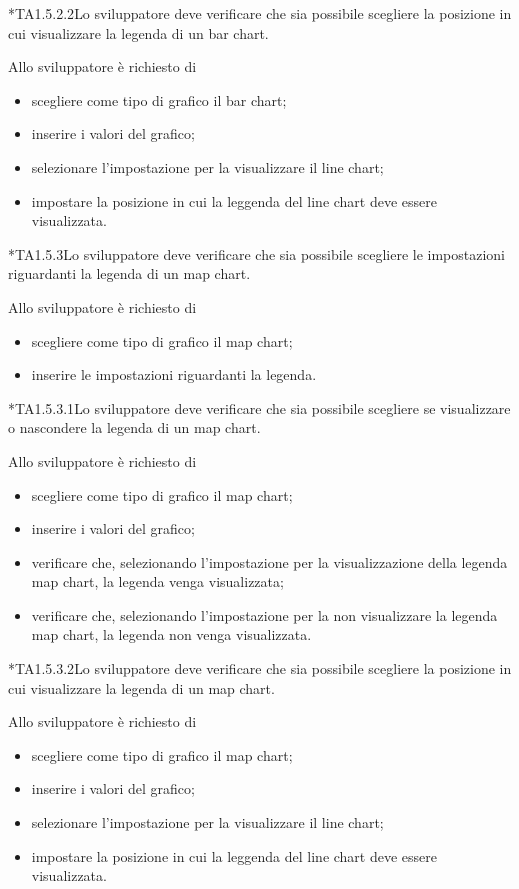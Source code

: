	*{TA1.5.2.2}Lo sviluppatore deve verificare che sia possibile scegliere la posizione in cui visualizzare la legenda di un bar chart.
			
		Allo sviluppatore è richiesto di
		\begin{itemize}
			\item scegliere come tipo di grafico il bar chart;
			\item inserire i valori del grafico;
			\item selezionare l'impostazione per la visualizzare il line chart;
			\item impostare la posizione in cui la leggenda del line chart deve essere visualizzata.
		\end{itemize}

	*{TA1.5.3}Lo sviluppatore deve verificare che sia possibile scegliere le impostazioni riguardanti la legenda di un map chart.

		Allo sviluppatore è richiesto di
		\begin{itemize}
			\item scegliere come tipo di grafico il map chart;
			\item inserire le impostazioni riguardanti la legenda.
		\end{itemize}

	*{TA1.5.3.1}Lo sviluppatore deve verificare che sia possibile scegliere se visualizzare o nascondere la legenda di un map chart.
			
		Allo sviluppatore è richiesto di
		\begin{itemize}
			\item scegliere come tipo di grafico il map chart;
			\item inserire i valori del grafico;
			\item verificare che, selezionando l'impostazione per la visualizzazione della legenda map chart, la legenda venga visualizzata;
			\item verificare che, selezionando l'impostazione per la non visualizzare la legenda map chart, la legenda non venga visualizzata.
		\end{itemize}

	*{TA1.5.3.2}Lo sviluppatore deve verificare che sia possibile scegliere la posizione in cui visualizzare la legenda di un map chart.
			
		Allo sviluppatore è richiesto di
		\begin{itemize}
			\item scegliere come tipo di grafico il map chart;
			\item inserire i valori del grafico;
			\item selezionare l'impostazione per la visualizzare il line chart;
			\item impostare la posizione in cui la leggenda del line chart deve essere visualizzata.
		\end{itemize}


